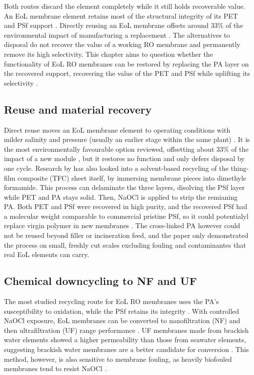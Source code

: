 Both routes discard the element completely while it still holds recoverable value. An EoL membrane element retains most of the structural integrity of its PET and PSf support \citep{Molinaa2018}. Directly reusing an EoL membrane offsets around 33\% of the environmental impact of manufacturing a replacement \citep{Lawler2015}. The alternatives to disposal do not recover the value of a working RO membrane and permanently remove its high selectivity. This chapter aims to question whether the functionality of EoL RO membranes can be restored by replacing the PA layer on the recovered support, recovering the value of the PET and PSf while uplifting its selectivity \citep{Ogbe2025,Ogbe2026}.


\subsection{Reuse and material recovery}
\label{sec:reuse}
Direct reuse moves an EoL membrane element to operating conditions with milder salinity and pressure (usually an earlier stage within the same plant) \citep{Lawler2015}. It is the most environmentally favourable option reviewed, offsetting about 33\% of the impact of a new module \citep{Lawler2015}, but it restores no function and only defers disposal by one cycle. Research by \cite{Guclu2022} has also looked into a solvent-based recycling of the thing-film composite (TFC) sheet itself, by immersing membrane pieces into dimethyle formamide. This process can delaminate the three layers, disolving the PSf layer while PET and PA stays solid. Then, NaOCl is applied to strip the remianing PA. Both PET and PSf were recovered in high purity, and the recovered PSf had a molecular weight comparable to commercial pristine PSf, so it could potentialyl replace virgin polymer in new membranes \citep{Guclu2022}. The cross-linked PA however could not be reused beyond filler or incineration feed, and the paper only demonstrated the process on small, freshly cut scales excluding fouling and contaminantes that real EoL elements can carry.  

\subsection{Chemical downcycling to NF and UF}
\label{sec:downcycling}
The most studied recycling route for EoL RO membranes uses the PA's susceptibility to oxidation, while the PSf retains its integrity \citep{GarciaPacheco2015,Molinaa2018}. With controlled NaOCl exposure, EoL membranes can be converted to nanofiltration (NF) and then ultrafiltration (UF) range performance \citep{GarciaPacheco2015}. UF membranes made from brackish water elements showed a higher permeability than those from seawater elements, suggesting brackish water membranes are a better candidate for conversion \citep{GarciaPacheco2015}. This method, however, is also sensitive to membrane fouling, as heavily biofouled membranes tend to resist NaOCl \citep{Molinaa2018}.

